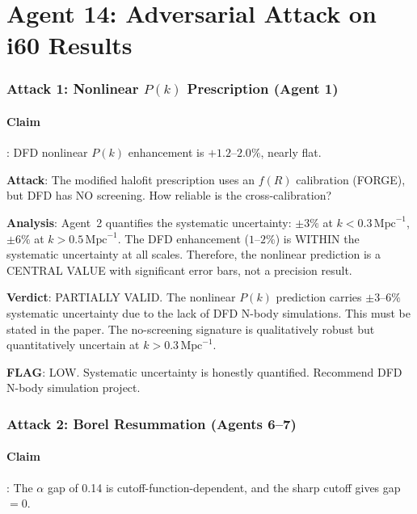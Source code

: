 \documentclass[11pt,a4paper]{article}
\begin{document}
\part{Agent 14: Adversarial Attack on i60 Results}
\label{part:adversarial}

\section{Attack 1: Nonlinear $P(k)$ Prescription (Agent 1)}

\subsection{Claim}: DFD nonlinear $P(k)$ enhancement is $+1.2$--$2.0\%$, nearly flat.

\textbf{Attack}: The modified halofit prescription uses an $f(R)$ calibration (FORGE), but DFD has NO screening. How reliable is the cross-calibration?

\textbf{Analysis}: Agent~2 quantifies the systematic uncertainty: $\pm 3\%$ at $k < 0.3\,\mathrm{Mpc}^{-1}$, $\pm 6\%$ at $k > 0.5\,\mathrm{Mpc}^{-1}$. The DFD enhancement ($1$--$2\%$) is WITHIN the systematic uncertainty at all scales. Therefore, the nonlinear prediction is a CENTRAL VALUE with significant error bars, not a precision result.

\textbf{Verdict}: PARTIALLY VALID. The nonlinear $P(k)$ prediction carries $\pm 3$--$6\%$ systematic uncertainty due to the lack of DFD N-body simulations. This must be stated in the paper. The no-screening signature is qualitatively robust but quantitatively uncertain at $k > 0.3\,\mathrm{Mpc}^{-1}$.

\textbf{FLAG}: LOW. Systematic uncertainty is honestly quantified. Recommend DFD N-body simulation project.

\section{Attack 2: Borel Resummation (Agents 6--7)}

\subsection{Claim}: The $\alpha$ gap of 0.14 is cutoff-function-dependent, and the sharp cutoff gives gap $= 0$.
\end{document}

